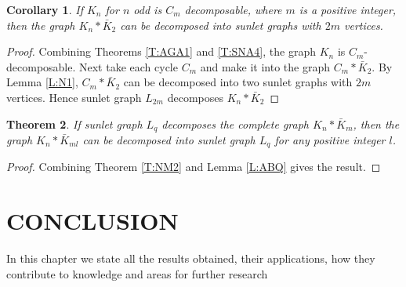 \documentclass[12pt]{report}
\newtheorem{thm}{Theorem}[section]
\newtheorem{cor}[thm]{Corollary}
\begin{document}
\begin{cor}
If $K_n$ for $n$ odd is $C_m$ decomposable, where $m$
is a positive integer, then the graph $K_n*\bar{K}_{2}$ can be decomposed into sunlet graphs with $2m$
vertices.
\end{cor}
\begin{proof}
Combining Theorems \ref{T:AGA1} and \ref{T:SNA4}, the graph $K_n$ is $C_m$-decomposable.
Next take each cycle $C_m$  and make it into the graph
$C_m*\bar{K}_{2}$. By Lemma \ref{L:N1}, $C_m*\bar{K}_{2}$ can be
decomposed into two sunlet graphs with $2m$ vertices. Hence sunlet
graph $L_{2m}$ decomposes $K_n*\bar{K}_{2}$
\end{proof}
\begin{thm}
If sunlet graph $L_q$ decomposes the complete graph
$K_n*\bar{K}_{m}$, then the graph
$K_n*\bar{K}_{ml}$ can be decomposed into
sunlet graph $L_q$ for any positive integer $l$.
\end{thm}
\begin{proof}
Combining Theorem \ref{T:NM2} and Lemma \ref{L:ABQ}
gives the result.
\end{proof}
\chapter{CONCLUSION}
In this chapter we state all the results obtained, their applications, how they contribute to knowledge and areas for further research
\end{document}
